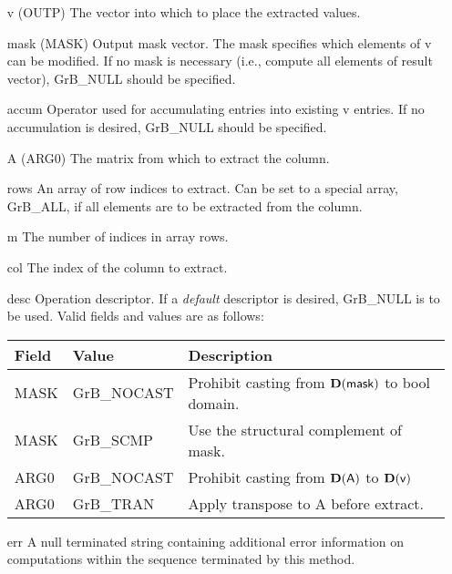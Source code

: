 \begin{itemize}[leftmargin=1in]
    \item[{\sf v}]   ({\sf OUTP}) The vector into which to place the extracted values.

    \item[{\sf mask}] ({\sf MASK}) Output mask vector. The mask
    specifies which elements of {\sf v} can be modified.
    If no mask is necessary (i.e., compute all elements of result
    vector), {\sf GrB\_NULL} should be specified.

    \item[{\sf accum}]  Operator used for accumulating entries into existing {\sf v} entries. 
			If no accumulation is desired, {\sf GrB\_NULL} should be specified.

    \item[{\sf A}]      ({\sf ARG0}) The matrix from which to extract the column.

    \item[{\sf rows}]   An array of row indices to extract. Can
                              be set to a special array, {\sf GrB\_ALL}, if all elements
                              are to be extracted from the column.
    \item[{\sf m}]      The number of indices in array {\sf rows}.
    \item[{\sf col}]    The index of the column to extract.

    \item[{\sf desc}]   Operation descriptor. If a
    \emph{default} descriptor is desired, {\sf GrB\_NULL} is to be
    used.  Valid fields and values are as follows: \\
    \begin{tabular}{lll}
    Field  & Value & Description \\
    \hline
    {\sf MASK} & {\sf GrB\_NOCAST} & Prohibit casting from $\bold{D}({\sf mask})$ to {\sf bool} domain. \\
    {\sf MASK} & {\sf GrB\_SCMP} & Use the structural complement of {\sf mask}. \\
    {\sf ARG0} & {\sf GrB\_NOCAST} & Prohibit casting from $\bold{D}({\sf A})$ to $\bold{D}({\sf v})$ \\
    {\sf ARG0} & {\sf GrB\_TRAN} & Apply transpose to {\sf A} before extract. \\
    \end{tabular}
    \item[{\sf err}]     A null terminated string containing additional error
                         information on computations within the sequence 
                         terminated by this method. 

\end{itemize}

